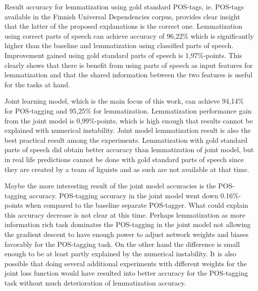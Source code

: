 \documentclass[12pt,a4paper,english
]{tutthesis}
\begin{document}
Result accuracy for lemmatization using gold standard POS-tags, ie. POS-tags available in the Finnish Universal Dependencies corpus, provides clear insight that the latter of the proposed explanations is the correct one. Lemmatization using correct parts of speech can achieve accuracy of 96,22\% which is significantly higher than the baseline and lemmatization using classified parts of speech. Improvement gained using gold standard parts of speech is 1,97\%-points. This clearly shows that there is benefit from using parts of speech as input features for lemmatization and that the shared information between the two features is useful for the tasks at hand.

Joint learning model, which is the main focus of this work, can achieve 94,14\% for POS-tagging and 95,25\% for lemmatization. Lemmatization performance gain from the joint model is 0,99\%-points, which is high enough that results cannot be explained with numerical instability. Joint model lemmatization result is also the best practical result among the experiments. Lemmatization with gold standard parts of speech did obtain better accuracy than lemmatization of joint model, but in real life predictions cannot be done with gold standard parts of speech since they are created by a team of liguists and as such are not available at that time.

Maybe the more interesting result of the joint model accuracies is the POS-tagging accuracy. POS-tagging accuracy in the joint model went down 0.16\%-points when compared to the baseline separate POS-tagger. What could explain this accuracy decrease is not clear at this time. Perhaps lemmatization as more information rich task dominates the POS-tagging in the joint model not allowing the gradient descent to have enough power to adjust network weights and biases favorably for the POS-tagging task. On the other hand the difference is small enough to be at least partly explained by the numerical instability. It is also possible that doing several additional experiments with different weights for the joint loss function would have resulted into better accuracy for the POS-tagging task without much deterioration of lemmatization accuracy.
\end{document}
